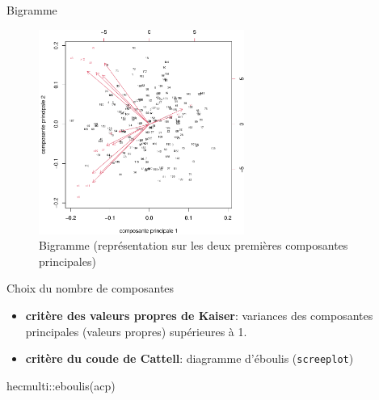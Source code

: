 \documentclass[
  ignorenonframetext,
]{beamer}
\newenvironment{Shaded}{\begin{snugshade}}{\end{snugshade}}
\newcommand{\FunctionTok}[1]{\textcolor[rgb]{0.28,0.35,0.67}{#1}}
\newcommand{\NormalTok}[1]{\textcolor[rgb]{0.00,0.23,0.31}{#1}}
\newcommand{\SpecialCharTok}[1]{\textcolor[rgb]{0.37,0.37,0.37}{#1}}
\providecommand{\tightlist}{%
  \setlength{\itemsep}{0pt}\setlength{\parskip}{0pt}}\usepackage{longtable,booktabs,array}
\begin{document}
\begin{frame}{Bigramme}
\protect\hypertarget{bigramme}{}
\begin{figure}

{\centering \includegraphics[width=0.6\textwidth,height=\textheight]{MATH60602-diapos3_files/figure-beamer/fig-bigramme-1.pdf}

}

\caption{\label{fig-bigramme}Bigramme (représentation sur les deux
premières composantes principales)}

\end{figure}
\end{frame}

\begin{frame}[fragile]{Choix du nombre de composantes}
\protect\hypertarget{choix-du-nombre-de-composantes}{}
\begin{itemize}
\tightlist
\item
  \textbf{critère des valeurs propres de Kaiser}: variances des
  composantes principales (valeurs propres) supérieures à 1.
\item
  \textbf{critère du coude de Cattell}: diagramme d'éboulis
  (\texttt{screeplot})
\end{itemize}

\begin{Shaded}
\begin{Highlighting}[]
\NormalTok{hecmulti}\SpecialCharTok{::}\FunctionTok{eboulis}\NormalTok{(acp)}
\end{Highlighting}
\end{Shaded}
\end{frame}
\end{document}
